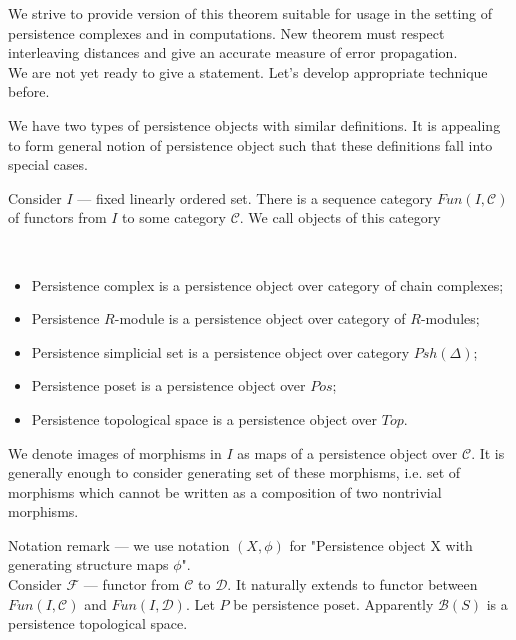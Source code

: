 We strive to provide version of this theorem suitable for usage in the setting of persistence complexes and in computations. New theorem must respect interleaving distances and give an accurate measure of error propagation.\\
We are not yet ready to give a statement. Let's develop appropriate technique before.

We have two types of persistence objects with similar definitions. It is appealing to form general notion of persistence object such that these definitions fall into special cases.\\

\begin{definition}
  Consider $I$ --- fixed linearly ordered set. There is a sequence category $Fun(I, \mathcal{C})$ of functors from $I$ to some category $\mathcal{C}$. We call objects of this category 
\end{definition}

\begin{example} ~ \par
  \begin{itemize}
    \item Persistence complex is a persistence object over category of chain complexes;
    \item Persistence $R$-module is a persistence object over category of $R$-modules;
    \item Persistence simplicial set is a persistence object over category $Psh(\Delta)$;
    \item Persistence poset is a persistence object over $Pos$;
    \item Persistence topological space is a persistence object over $Top$.
  \end{itemize}
\end{example}

\begin{definition}
  We denote images of morphisms in $I$ as  maps of a persistence object over $\mathcal{C}$. It is generally enough to consider generating set of these morphisms, i.e. set of morphisms which cannot be written as a composition of two nontrivial morphisms.
\end{definition}

Notation remark --- we use notation $(X,\phi)$ for "Persistence object X with generating structure maps $\phi$".\\

Consider $\mathcal{F}$ --- functor from $\mathcal{C}$ to $\mathcal{D}$. It naturally extends to functor between $Fun(I,\mathcal{C})$ and $Fun(I,\mathcal{D})$. Let $P$ be persistence poset. Apparently $\mathcal{B}(S)$ is a persistence topological space.\\

